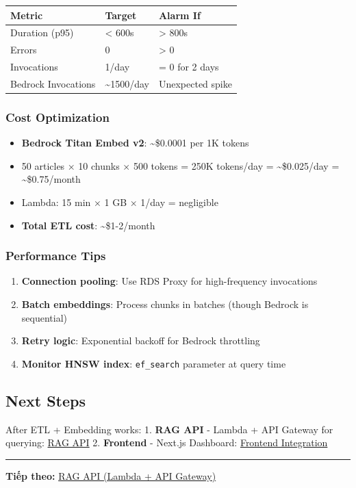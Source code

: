\begingroup
\small
\setlength{\tabcolsep}{3pt}
\renewcommand{\arraystretch}{1.15}
\begin{longtable}[]{@{}lll@{}}
\toprule\noalign{}
Metric & Target & Alarm If \\
\midrule\noalign{}
\endhead
\bottomrule\noalign{}
\endlastfoot
Duration (p95) & \textless{} 600s & \textgreater{} 800s \\
Errors & 0 & \textgreater{} 0 \\
Invocations & 1/day & = 0 for 2 days \\
Bedrock Invocations & \textasciitilde1500/day & Unexpected spike \\
\end{longtable}
\endgroup

\hypertarget{cost-optimization}{%
\subsubsection{Cost Optimization}}

\begin{itemize}
\tightlist
\item
  \textbf{Bedrock Titan Embed v2}: \textasciitilde\$0.0001 per 1K tokens
\item
  50 articles × 10 chunks × 500 tokens = 250K tokens/day =
  \textasciitilde\$0.025/day = \textasciitilde\$0.75/month
\item
  Lambda: 15 min × 1 GB × 1/day = negligible
\item
  \textbf{Total ETL cost}: \textasciitilde\$1-2/month
\end{itemize}

\hypertarget{performance-tips}{%
\subsubsection{Performance Tips}}

\begin{enumerate}
\def\labelenumi{\arabic{enumi}.}
\tightlist
\item
  \textbf{Connection pooling}: Use RDS Proxy for high-frequency
  invocations
\item
  \textbf{Batch embeddings}: Process chunks in batches (though Bedrock
  is sequential)
\item
  \textbf{Retry logic}: Exponential backoff for Bedrock throttling
\item
  \textbf{Monitor HNSW index}: \texttt{ef\_search} parameter at query
  time
\end{enumerate}

\hypertarget{next-steps}{%
\subsection{Next Steps}}

After ETL + Embedding works: 1. \textbf{RAG API} - Lambda + API Gateway
for querying: \href{5.13-RAG-API/}{RAG API} 2. \textbf{Frontend} -
Next.js Dashboard: \href{5.14-Frontend/}{Frontend Integration}

\begin{center}\rule{0.5\linewidth}{0.5pt}\end{center}

\textbf{Tiếp theo:} \href{5.13-RAG-API/}{RAG API (Lambda + API Gateway)}
